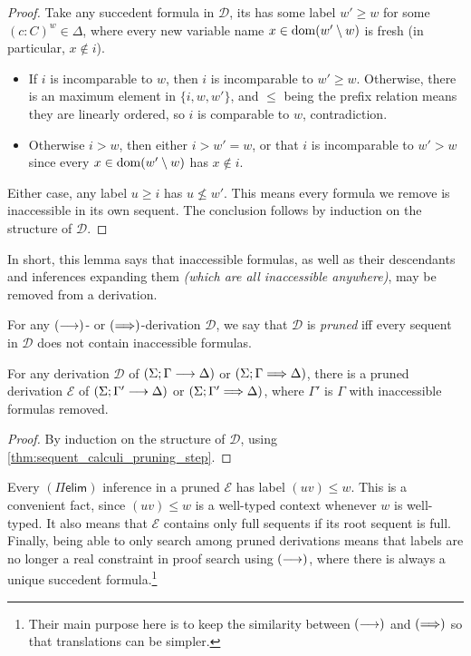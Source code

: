\documentclass[twoside]{report}
\begin{document}
\begin{proof}
Take any succedent formula in $\mathcal D$, its has some label $w' \geq w$ for some $(c : C)^w \in \Delta$, where every new variable name $x \in \operatorname{dom} (w' \setminus w)$ is fresh (in particular, $x \notin i$).
\begin{itemize}
    \item If $i$ is incomparable to $w$, then $i$ is incomparable to $w' \geq w$. Otherwise, there is an maximum element in $\{i, w, w'\}$, and $\leq$ being the prefix relation means they are linearly ordered, so $i$ is comparable to $w$, contradiction.
    \item Otherwise $i > w$, then either $i > w' = w$, or that $i$ is incomparable to $w' > w$ since every $x \in \operatorname{dom} (w' \setminus w)$ has $x \notin i$.
\end{itemize}
Either case, any label $u \geq i$ has $u \not\leq w'$. This means every formula we remove is inaccessible in its own sequent. The conclusion follows by induction on the structure of $\mathcal D$.
\end{proof}

In short, this lemma says that inaccessible formulas, as well as their descendants and inferences expanding them \emph{(which are all inaccessible anywhere)}, may be removed from a derivation.

\begin{definition}
\label{def:sequent_calculi_pruned_derivations}
For any $(\longrightarrow)$- or $(\Longrightarrow)$-derivation $\mathcal D$, we say that $\mathcal D$ is \emph{pruned} iff every sequent in $\mathcal D$ does not contain inaccessible formulas.
\end{definition}

\begin{proposition}
\label{thm:sequent_calculi_pruning}
For any derivation $\mathcal D$ of $(\Sigma; \Gamma \longrightarrow \Delta)$ or $(\Sigma; \Gamma \Longrightarrow \Delta)$, there is a pruned derivation $\mathcal E$ of $(\Sigma; \Gamma' \longrightarrow \Delta)$ or $(\Sigma; \Gamma' \Longrightarrow \Delta)$, where $\Gamma'$ is $\Gamma$ with inaccessible formulas removed.
\end{proposition}

\begin{proof}
By induction on the structure of $\mathcal D$, using \cref{thm:sequent_calculi_pruning_step}.
\end{proof}

Every $(\Pi\mathsf{elim})$ inference in a pruned $\mathcal E$ has label $(uv) \leq w$. This is a convenient fact, since $(uv) \leq w$ is a well-typed context whenever $w$ is well-typed. It also means that $\mathcal E$ contains only full sequents if its root sequent is full. Finally, being able to only search among pruned derivations means that labels are no longer a real constraint in proof search using $(\longrightarrow)$, where there is always a unique succedent formula.\footnote{Their main purpose here is to keep the similarity between $(\longrightarrow)$ and $(\Longrightarrow)$ so that translations can be simpler.}
\end{document}
